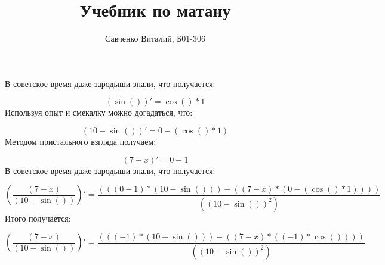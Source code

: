 \documentclass[a4paper,12pt]{article}
\author{Савченко Виталий, Б01-306}
\title{Учебник по матану}
\begin{document}
                 \maketitle 
В советское время даже зародыши знали, что получается: 

\begin{equation}
(\sin{()})' = \cos{()}*1
\end{equation}
Используя опыт и смекалку можно догадаться, что: 

\begin{equation}
(10-\sin{()})' = 0-(\cos{()}*1)
\end{equation}
Методом пристального взгляда получаем: 

\begin{equation}
(7-x)' = 0-1
\end{equation}
В советское время даже зародыши знали, что получается: 

\begin{equation}
(\frac{(7-x)}{(10-\sin{()})})' = \frac{(((0-1)*(10-\sin{()}))-((7-x)*(0-(\cos{()}*1))))}{((10-\sin{()})^2)}
\end{equation}
Итого получается: 

\begin{equation}
(\frac{(7-x)}{(10-\sin{()})})' = \frac{(((-1)*(10-\sin{()}))-((7-x)*((-1)*\cos{()})))}{((10-\sin{()})^2)}
\end{equation}
\end{document}
